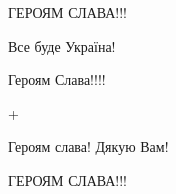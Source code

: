\begin{itemize}
ГЕРОЯМ СЛАВА!!! 🌹

 
Все буде Україна!

 
Героям Слава!!!!

 
+

 

Героям слава! Дякую Вам!

 
ГЕРОЯМ СЛАВА!!!

\end{itemize}

